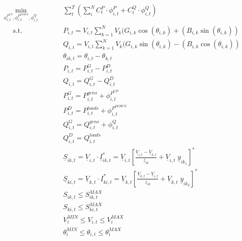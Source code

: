 \begin{subequations}
\begin{alignat}{2}
&\!\min_{\phi_{i,t}^{P^{UP}},\phi_{i,t}^{P^{DOWN}},\phi_{i,t}^{Q}}  &\qquad& \sum_{t}^{T} \left( \sum_{i}^{N} C_t^{P} \cdot \phi_{i,t}^{P} + C_t^{Q} \cdot \phi_{i,t}^{Q} \right) \label{eq:optProb}\\ 
&\phantom{Mi} \text{s.t.} &      & P_{i,t} = V_{i,t} \sum_{k=1}^{N} V_{k} (G_{i,k} \cos(\theta_{i,k}) + (B_{i,k} \sin(\theta_{i,k})) \label{eq:activepowernodalbalance} \\ 
&				   &      & Q_{i,t} = V_{i,t} \sum_{k=1}^{N} V_{k} (G_{i,k} \sin(\theta_{i,k}) - (B_{i,k} \cos(\theta_{i,k})) \label{eq:reactivepowernodalbalance} \\
&                  &      & \theta_{ik,t} = \theta_{i,t} - \theta_{k,t}\label{eq:voltageangle} \\
&                  &      & P_{i,t} = P_{i,t}^{G} - P_{i,t}^{D} \label{eq:Pi} \\
&                  &      & Q_{i,t} = Q_{i,t}^{G} - Q_{i,t}^{D}  \label{eq:Qi} \\
& 				   & & P_{i,t}^{G} = P_{i,t}^{gens} + \phi_{i,t}^{P^{UP}}    \\
&  				   & & P_{i,t}^{D} = P_{i,t}^{loads} + \phi_{i,t}^{P^{DOWN}}  \\
& 				   & & Q_{i,t}^{G} = Q_{i,t}^{gens} + \phi_{i,t}^{Q}    \\
& 				   & & Q_{i,t}^{D} = Q_{i,t}^{loads}    \\
&                  &      & \underline{S}_{ik,t} = \underline{V}_{i,t} \cdot \underline{I}_{ik,t}^{*} = \underline{V}_{i,t} \left[ \frac{\underline{V}_{i,t} - \underline{V}_{k,t}}{\underline{z}_{ik}} + \underline{V}_{i,t} \; \underline{y}_{ik_1} \right]^{*}  \label{eq:apparentflowlineik} \\
&                  &      & \underline{S}_{ki,t} = \underline{V}_{k,t} \cdot \underline{I}_{ki,t}^{*} = \underline{V}_{k,t} \left[ \frac{\underline{V}_{k,t} - \underline{V}_{i,t}}{\underline{z}_{ik}} + \underline{V}_{k,t} \;  \underline{y}_{ik_2} \right]^{*}  \label{eq:apparentflowlineki} \\
&                  &      &  S_{ik,t} \leq S_{ik,t}^{MAX}  \label{eq:Siklimit} \\
&                  &      &  S_{ki,t} \leq S_{ki,t}^{MAX}   \label{eq:Skilimit} \\ 
&                  &      &  V_{i}^{MIN} \leq V_{i,t} \leq V_{i}^{MAX}  \label{eq:voltagelimit} \\
&                  &      & \theta_{i}^{MIN} \leq \theta_{i,t}  \leq \theta_{i}^{MAX}  \label{eq:voltageangle}
\end{alignat}
\end{subequations}

